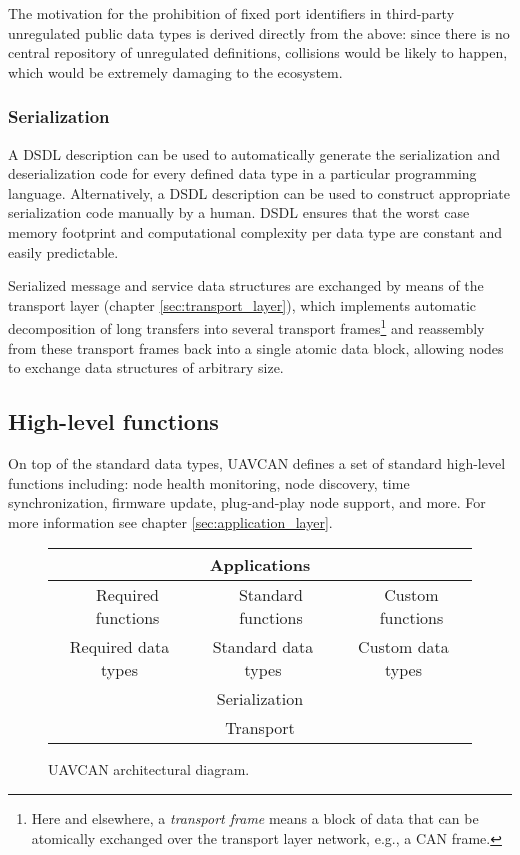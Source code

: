 The motivation for the prohibition of fixed port identifiers in third-party unregulated public data types is
derived directly from the above:
since there is no central repository of unregulated definitions,
collisions would be likely to happen, which would be extremely damaging to the ecosystem.

\subsubsection{Serialization}

A DSDL description can be used to automatically generate the serialization and deserialization code
for every defined data type in a particular programming language.
Alternatively, a DSDL description can be used to construct appropriate serialization code manually by a human.
DSDL ensures that the worst case memory footprint and computational complexity per data type
are constant and easily predictable.

Serialized message and service data structures are exchanged by means of the transport
layer (chapter \ref{sec:transport_layer}), which implements automatic decomposition of
long transfers into several transport frames\footnote{Here and
elsewhere, a \emph{transport frame} means a block of data that can be atomically exchanged
over the transport layer network, e.g., a CAN frame.} and reassembly from these transport frames
back into a single atomic data block, allowing nodes to exchange data structures of
arbitrary size.

\subsection{High-level functions}

On top of the standard data types, UAVCAN defines a set of standard high-level functions including:
node health monitoring, node discovery, time synchronization, firmware update,
plug-and-play node support, and more.
For more information see chapter \ref{sec:application_layer}.

\begin{figure}[hbt]
    \centering
    \begin{tabular}{|c|c|l|c|l|c|}
        \hline
        \multicolumn{6}{|c|}{Applications} \\ \hline

        \multicolumn{1}{|l|}{} & Required functions & & Standard functions & & Custom functions \\
        \cline{2-2} \cline{4-4} \cline{6-6}

        \multicolumn{2}{|c|}{Required data types} &
        \multicolumn{2}{c|}{Standard data types} &
        \multicolumn{2}{c|}{Custom data types} \\ \hline

        \multicolumn{6}{|c|}{Serialization} \\ \hline

        \multicolumn{6}{|c|}{Transport} \\ \hline
    \end{tabular}
    \caption{UAVCAN architectural diagram.\label{fig:architecture}}
\end{figure}

